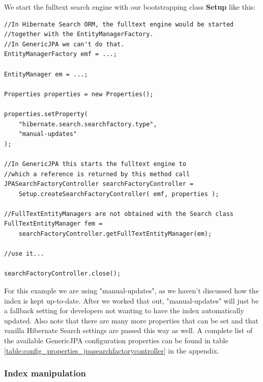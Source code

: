 \noindent
We start the fulltext search engine with our bootstrapping class \textbf{Setup} like this:
\\
\lstset{language=java}
\begin{lstlisting}[frame=htrbl, caption={MassIndexer usage with Hibernate Search ORM}, label={lst:massindexing_hsearch_orm.java}]
//In Hibernate Search ORM, the fulltext engine would be started 
//together with the EntityManagerFactory.
//In GenericJPA we can't do that.
EntityManagerFactory emf = ...;

EntityManager em = ...;

Properties properties = new Properties();

properties.setProperty(
	"hibernate.search.searchfactory.type", 
	"manual-updates"
);

//In GenericJPA this starts the fulltext engine to 
//which a reference is returned by this method call
JPASearchFactoryController searchFactoryController =
	Setup.createSearchFactoryController( emf, properties );

//FullTextEntityManagers are not obtained with the Search class
FullTextEntityManager fem = 
	searchFactoryController.getFullTextEntityManager(em);

//use it...

searchFactoryController.close();
\end{lstlisting}
\noindent
For this example we are using "manual-updates", as we haven't discussed how the index is kept up-to-date. After we worked that out, "manual-updates" will just be a fallback setting for developers not wanting to have the index automatically updated.  Also note that there are many more properties that can be set and that vanilla Hibernate Search settings are passed this way as well. A complete list of the available GenericJPA configuration properties can be found in table \ref{table:config_properties_jpasearchfactorycontroller} in the appendix.

\pagebreak

\subsubsection{Index manipulation} \label{using_hsearch_genericjpa_index}

